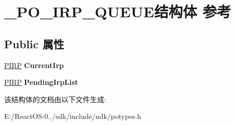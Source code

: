 \hypertarget{struct___p_o___i_r_p___q_u_e_u_e}{}\section{\+\_\+\+P\+O\+\_\+\+I\+R\+P\+\_\+\+Q\+U\+E\+U\+E结构体 参考}
\label{struct___p_o___i_r_p___q_u_e_u_e}
\subsection*{Public 属性}
\begin{DoxyCompactItemize}
\item 
\mbox{\label{struct___p_o___i_r_p___q_u_e_u_e_a1647d003e04d32714f69775d498a65b9}} 
\hyperlink{interfacevoid}{P\+I\+RP} {\bfseries Current\+Irp}
\item 
\mbox{\label{struct___p_o___i_r_p___q_u_e_u_e_ad6d06e14b4ef38b6bc76a76d3770e044}} 
\hyperlink{interfacevoid}{P\+I\+RP} {\bfseries Pending\+Irp\+List}
\end{DoxyCompactItemize}


该结构体的文档由以下文件生成\+:\begin{DoxyCompactItemize}
\item 
E\+:/\+React\+O\+S-\/0../sdk/include/ndk/potypes.\+h\end{DoxyCompactItemize}
